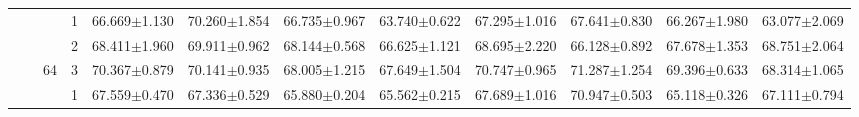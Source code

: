 \begin{table}[htpb]
{\begin{tabular}{c|c|c|c|rr|rr|rr|rr}
                                 &                                                                                 &                                                                                        & 1                                                                                         & 66.669$\pm$1.130                        & 70.260$\pm$1.854                        & 66.735$\pm$0.967                        & 63.740$\pm$0.622                        & 67.295$\pm$1.016                        & 67.641$\pm$0.830                        & 66.267$\pm$1.980                        & 63.077$\pm$2.069                       \\
                                 &                                                                                 &                                                                                        & 2                                                                                         & 68.411$\pm$1.960                        & 69.911$\pm$0.962                        & 68.144$\pm$0.568                        & 66.625$\pm$1.121                        & 68.695$\pm$2.220                        & 66.128$\pm$0.892                        & 67.678$\pm$1.353                        & 68.751$\pm$2.064                       \\
                                 &                                                                                 & \multirow{-3}{*}{64}                                                                   & 3                                                                                         & 70.367$\pm$0.879                        & 70.141$\pm$0.935                        & 68.005$\pm$1.215                        & 67.649$\pm$1.504                        & 70.747$\pm$0.965                        & 71.287$\pm$1.254                        & 69.396$\pm$0.633                        & 68.314$\pm$1.065                       \\ \cline{3-12} 
                                 &                                                                                 &                                                                                        & 1                                                                                         & 67.559$\pm$0.470                        & 67.336$\pm$0.529                        & 65.880$\pm$0.204                        & 65.562$\pm$0.215                        & 67.689$\pm$1.016                        & 70.947$\pm$0.503                        & 65.118$\pm$0.326                        & 67.111$\pm$0.794                       \\

\end{tabular}}
\end{table}
